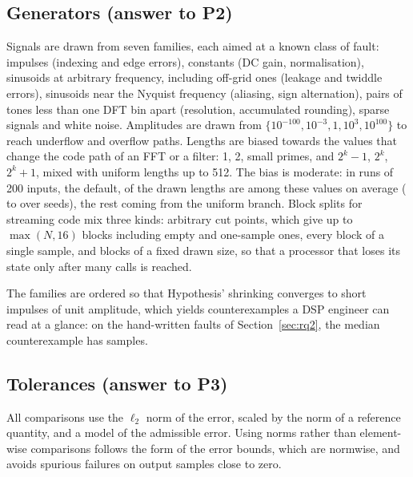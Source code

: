 \documentclass[10pt,conference]{IEEEtran}
\begin{document}
\subsection{Generators (answer to P2)}
\label{sec:generators}
Signals are drawn from seven families, each aimed at a known class of fault:
impulses (indexing and edge errors), constants (DC gain, normalisation),
sinusoids at arbitrary frequency, including off-grid ones (leakage and twiddle
errors), sinusoids near the Nyquist frequency (aliasing, sign alternation),
pairs of tones less than one DFT bin apart (resolution, accumulated rounding),
sparse signals and white noise. Amplitudes are drawn from
$\{10^{-100},10^{-3},1,10^{3},10^{100}\}$ to reach underflow and overflow paths.
Lengths are biased towards the values that change the code path of an FFT or
a filter: 1, 2, small primes, and $2^k-1$, $2^k$, $2^k+1$, mixed with uniform
lengths up to 512. The bias is moderate: in runs of 200 inputs, the default,
\genPathoShare{} of the drawn lengths are among these values on average
(\genPathoShareMin{} to \genPathoShareMax{} over \genPathoRuns{} seeds), the
rest coming from the uniform branch. Block splits for streaming code mix three kinds: arbitrary
cut points, which give up to $\max(N,16)$ blocks including empty and one-sample
ones, every block of a single sample, and blocks of a fixed drawn size, so that
a processor that loses its state only after many calls is reached.

The families are ordered so that Hypothesis' shrinking converges to short
impulses of unit amplitude, which yields counterexamples a DSP engineer can read
at a glance: on the hand-written faults of Section~\ref{sec:rq2}, the median
counterexample has \handMedianLen{} samples.

\subsection{Tolerances (answer to P3)}
\label{sec:tolerances}
All comparisons use the $\ell_2$ norm of the error, scaled by the norm of a
reference quantity, and a model of the admissible error. Using norms rather
than element-wise comparisons follows the form of the error bounds, which are
normwise, and avoids spurious failures on output samples close to zero.
\end{document}

